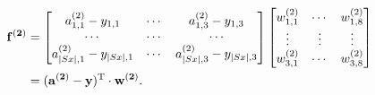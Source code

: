 \documentclass[12pt,titlepage]{article}
\begin{document}
\begin{equation}
\begin{split}
\mathbf{f^{(2)}}
&=\begin{bmatrix}
 a_{1,1}^{(2)}-y_{1,1}& \cdots & a_{1,3}^{(2)}-y_{1,3}\\ 
 \cdots &\cdots  & \cdots\\ 
 a_{|Sx|,1}^{(2)}-y_{|Sx|,1}& \cdots & a_{|Sx|,3}^{(2)}-y_{|Sx|,3}
\end{bmatrix}
\begin{bmatrix}
 w_{1,1}^{(2)}& \cdots & w_{1,8}^{(2)}\\ 
 \vdots& \vdots & \vdots\\ 
 w_{3,1}^{(2)}& \cdots & w_{3,8}^{(2)}
\end{bmatrix}\\
&=(\mathbf{a^{(2)}-y})^{\textup{T}}\cdot\mathbf{w^{(2)}}.
\end{split}
\end{equation}
\end{document}
